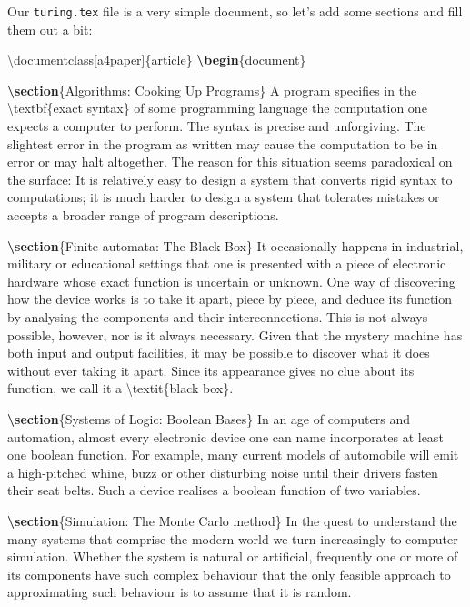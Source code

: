 \documentclass[
]{book}
\newenvironment{Shaded}{\begin{snugshade}}{\end{snugshade}}
\newcommand{\BuiltInTok}[1]{#1}
\newcommand{\ExtensionTok}[1]{#1}
\newcommand{\FunctionTok}[1]{\textcolor[rgb]{0.00,0.00,0.00}{#1}}
\newcommand{\KeywordTok}[1]{\textcolor[rgb]{0.13,0.29,0.53}{\textbf{#1}}}
\newcommand{\NormalTok}[1]{#1}
\begin{document}
Our \texttt{turing.tex} file is a very simple document, so let's add some sections and fill them out a bit:

\begin{Shaded}
\begin{Highlighting}[]
\BuiltInTok{\textbackslash{}documentclass}\NormalTok{[a4paper]\{}\ExtensionTok{article}\NormalTok{\}}
\KeywordTok{\textbackslash{}begin}\NormalTok{\{}\ExtensionTok{document}\NormalTok{\}}


\KeywordTok{\textbackslash{}section}\NormalTok{\{Algorithms: Cooking Up Programs\}}
\NormalTok{A program specifies in the }\FunctionTok{\textbackslash{}textbf}\NormalTok{\{exact syntax\} of some programming language the computation one expects a computer to perform. The syntax is precise and unforgiving. The slightest error in the program as written may cause the computation to be in error or may halt altogether. The reason for this situation seems paradoxical on the surface: It is relatively easy to design a system that converts rigid syntax to computations; it is much harder to design a system that tolerates mistakes or accepts a broader range of program descriptions.}

\KeywordTok{\textbackslash{}section}\NormalTok{\{Finite automata: The Black Box\}}
\NormalTok{It occasionally happens in industrial, military or educational settings that one is presented with a piece of electronic hardware whose exact function is uncertain or unknown. One way of discovering how the device works is to take it apart, piece by piece, and deduce its function by analysing the components and their interconnections. This is not always possible, however, nor is it always necessary. Given that the mystery machine has both input and output facilities, it may be possible to discover what it does without ever taking it apart. Since its appearance gives no clue about its function, we call it a }\FunctionTok{\textbackslash{}textit}\NormalTok{\{black box\}.}

\KeywordTok{\textbackslash{}section}\NormalTok{\{Systems of Logic: Boolean Bases\}}
\NormalTok{In an age of computers and automation, almost every electronic device one can name incorporates at least one boolean function. For example, many current models of automobile will emit a high{-}pitched whine, buzz or other disturbing noise until their drivers fasten their seat belts. Such a device realises a boolean function of two variables.}

\KeywordTok{\textbackslash{}section}\NormalTok{\{Simulation: The Monte Carlo method\}}
\NormalTok{In the quest to understand the many systems that comprise the modern world we turn increasingly to computer simulation. Whether the system is natural or artificial, frequently one or more of its components have such complex behaviour that the only feasible approach to approximating such behaviour is to assume that it is random.}


\end{Highlighting}
\end{Shaded}
\end{document}
